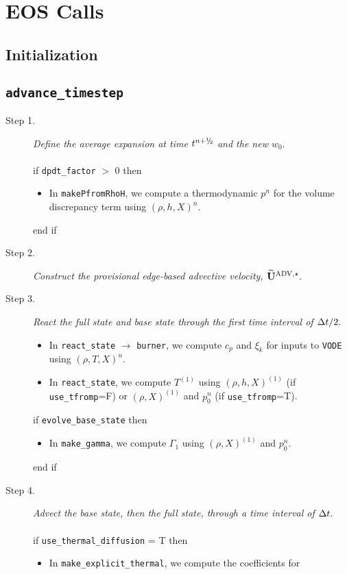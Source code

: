 \section{EOS Calls}
\subsection{Initialization}
\subsection{{\tt advance\_timestep}}
\begin{description}
\item[Step 1.] {\em Define the average expansion at time $t^\nph$ and the new $w_0.$}\\ \\
if {\tt dpdt\_factor} $>$ 0 then
\begin{itemize}
\item In {\tt makePfromRhoH}, we compute a thermodynamic $p^n$ for the volume discrepancy 
term using $(\rho,h,X)^n$.
\end{itemize}
end if
\item[Step 2.] {\em Construct the provisional edge-based advective velocity, $\widetilde{\mathbf{U}}^{\mathrm{ADV},\star}.$}
\item[Step 3.] {\em React the full state and base state through the first time interval 
of $\Delta t/2.$}
\begin{itemize}
\item In {\tt react\_state} $\rightarrow$ {\tt burner}, we compute $c_p$ and $\xi_k$ 
for inputs to {\tt VODE} using $(\rho,T,X)^n$.
\item In {\tt react\_state}, we compute $T^{(1)}$ using $(\rho,h,X)^{(1)}$ 
(if {\tt use\_tfromp}=F) or $(\rho,X)^{(1)}$ and $p_0^n$ (if {\tt use\_tfromp}=T).
\end{itemize}
if {\tt evolve\_base\_state} then
\begin{itemize}
\item In {\tt make\_gamma}, we compute $\Gamma_1$ using $(\rho,X)^{(1)}$ and $p_0^n$.
\end{itemize}
end if
\item[Step 4.] {\em Advect the base state, then the full state, through a time interval 
of $\Delta t.$}\\ \\
if {\tt use\_thermal\_diffusion} = T then
\begin{itemize}
\item In {\tt make\_explicit\_thermal}, we compute the coefficients for 

\end{itemize}
\end{description}
